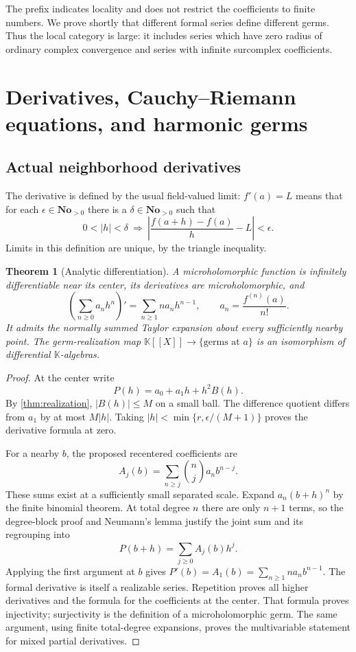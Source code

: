 \documentclass[11pt,letterpaper]{article}
\numberwithin{equation}{section}
\newtheorem{theorem}{Theorem}[section]
\theoremstyle{definition}
\theoremstyle{remark}
\newcommand{\No}{\mathbf{No}}
\newcommand{\K}{\mathbb K}
\begin{document}
The prefix indicates locality and does not restrict the coefficients to
finite numbers. We prove shortly that different formal series define
different germs. Thus the local category is large: it includes series
which have zero radius of ordinary complex convergence and series with
infinite surcomplex coefficients.

\section{Derivatives, Cauchy--Riemann equations, and harmonic germs}
\label{sec:calculus}

\subsection{Actual neighborhood derivatives}

The derivative is defined by the usual field-valued limit:
$f'(a)=L$ means that for each $\epsilon\in\No_{>0}$ there is a
$\delta\in\No_{>0}$ such that
\[
 0<|h|<\delta\ \Longrightarrow\
 \left|\frac{f(a+h)-f(a)}h-L\right|<\epsilon.
\]
Limits in this definition are unique, by the triangle inequality.

\begin{theorem}[Analytic differentiation]\label{thm:differentiation}
A microholomorphic function is infinitely differentiable near its center,
its derivatives are microholomorphic, and
\[
 \left(\sum_{n\ge0}a_nh^n\right)'=\sum_{n\ge1}na_nh^{n-1},\qquad
 a_n=\frac{f^{(n)}(a)}{n!}.
\]
It admits the normally summed Taylor expansion about every sufficiently
nearby point. The germ-realization map $\K[[X]]\to\{\text{germs at }a\}$
is an isomorphism of differential $\K$-algebras.
\end{theorem}
\begin{proof}
At the center write
\[
 P(h)=a_0+a_1h+h^2B(h).
\]
By \cref{thm:realization}, $|B(h)|\le M$ on a small ball. The difference
quotient differs from $a_1$ by at most $M|h|$. Taking
$|h|<\min\{r,\epsilon/(M+1)\}$ proves the derivative formula at zero.

For a nearby $b$, the proposed recentered coefficients are
\begin{equation}\label{eq:recenter}
 A_j(b)=\sum_{n\ge j}\binom nj a_n b^{n-j}.
\end{equation}
These sums exist at a sufficiently small separated scale. Expand
$a_n(b+h)^n$ by the finite binomial theorem. At total degree $n$ there
are only $n+1$ terms, so the degree-block proof and Neumann's lemma
justify the joint sum and its regrouping into
\[
 P(b+h)=\sum_{j\ge0}A_j(b)h^j.
\]
Applying the first argument at $b$ gives
$P'(b)=A_1(b)=\sum_{n\ge1}na_nb^{n-1}$.
The formal derivative is itself a realizable series. Repetition proves
all higher derivatives and the formula for the coefficients at the center.
That formula proves injectivity; surjectivity is the definition of a
microholomorphic germ. The same argument, using finite total-degree
expansions, proves the multivariable statement for mixed partial derivatives.
\end{proof}
\end{document}
